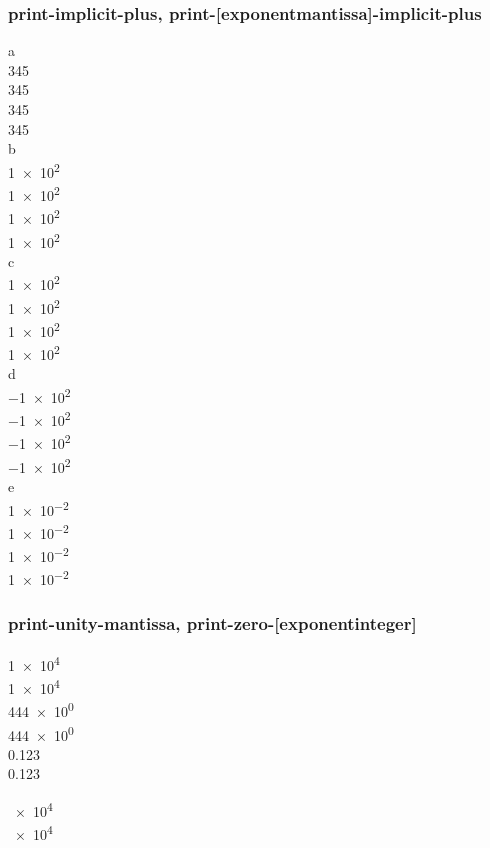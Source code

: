 \documentclass{article}
\begin{document}
\subsubsection{print-implicit-plus, print-[exponent\textbar mantissa]-implicit-plus}
a\\
\num{345} \\
\num[print-implicit-plus]{345} \\
\num[print-mantissa-implicit-plus]{345} \\
\num[print-exponent-implicit-plus]{345} \\
b\\
\num{1e2} \\
\num[print-implicit-plus]{1e2} \\
\num[print-mantissa-implicit-plus]{1e2} \\
\num[print-exponent-implicit-plus]{1e2} \\
c\\
\num{1e+2} \\
\num[print-implicit-plus]{1e+2} \\
\num[print-mantissa-implicit-plus]{1e+2} \\
\num[print-exponent-implicit-plus]{1e+2} \\
d\\
\num{-1e2} \\
\num[print-implicit-plus]{-1e2} \\
\num[print-mantissa-implicit-plus]{-1e2} \\
\num[print-exponent-implicit-plus]{-1e2} \\
e\\
\num{1e-2} \\
\num[print-implicit-plus]{1e-2} \\
\num[print-mantissa-implicit-plus]{1e-2} \\
\num[print-exponent-implicit-plus]{1e-2}

\subsubsection{print-unity-mantissa, print-zero-[exponent\textbar integer]}
\num{1e4} \\
\num[print-unity-mantissa = false]{1e4} \\
\num{444e0} \\
\num[print-zero-exponent = true]{444e0} \\
\num{0.123} \\
\num[print-zero-integer = false]{0.123}

\num{e4}\\
\num[print-unity-mantissa=false]{e4}
\end{document}
